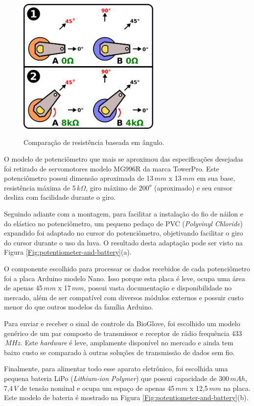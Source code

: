 \documentclass[
	12pt,				%
	openright,			%
	oneside,			%
	a4paper,			%
	english,			%
	brazil				%
	]{abntex2}
\begin{document}
		\begin{figure}[h!]
			\centering
			\caption{Comparação de resistência baseada em ângulo.}
  		\includegraphics[width=7cm]{./figures/pot-comparison.png}
  		\label{Fig:pot-comparison}
		\end{figure}
			
			O modelo de potenciômetro que mais se aproximou das especificações desejadas foi retirado de servomotores modelo MG996R da marca TowerPro. Este potenciômetro possui dimensão aproximada de 13$\,mm$ x 13$\,mm$ em sua base, resistência máxima de 5$\,k\Omega$, giro máximo de $200^{o}$ (aproximado) e seu cursor desliza com facilidade durante o giro. 

			Seguindo adiante com a montagem, para facilitar a instalação do fio de náilon e do elástico no potenciômetro, um pequeno pedaço de PVC (\textit{Polyvinyl Chloride}) expandido foi adaptado no cursor do potenciômetro, objetivando facilitar o giro do cursor durante o uso da luva. O resultado desta adaptação pode ser visto na Figura \ref{Fig:potentiometer-and-battery}(a).

			O componente escolhido para processar os dados recebidos de cada potenciômetro foi a placa Arduino modelo Nano. Isso porque esta placa é leve, ocupa uma área de apenas 45$\,mm$ x 17$\,mm$, possui vasta documentação e disponibilidade no mercado, além de ser compatível com diversos módulos externos e possuir custo menor do que outros modelos da família Arduino.

			Para enviar e receber o sinal de controle da BioGlove, foi escolhido um modelo genérico de um par composto de transmissor e receptor de rádio frequência 433$\,MHz$. Este \textit{hardware} é leve, amplamente disponível no mercado e ainda tem baixo custo se comparado à outras soluções de transmissão de dados sem fio.

			Finalmente, para alimentar todo esse aparato eletrônico, foi escolhida uma pequena bateria LiPo (\textit{Lithium-ion Polymer}) que possui capacidade de 300$\,mAh$, 7,4$\,V$ de tensão nominal e ocupa um espaço de apenas 45$\,mm$ x 12,5$\,mm$ na placa. Este modelo de bateria é mostrado na Figura \ref{Fig:potentiometer-and-battery}(b).
\end{document}
